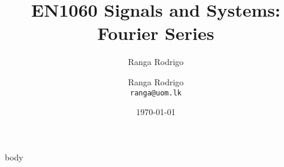 \documentclass[t, aspectratio=169,xcolor={svgnames}, 10pt]{beamer}
\title{EN1060 Signals and Systems: Fourier Series}
\author{Ranga Rodrigo}
\author[]{Ranga Rodrigo\\ \texttt{ranga@uom.lk}}
\institute[]{The University of Moratuwa, Sri Lanka}
\date{\today}
\begin{document}
    \begin{frame}
        \titlepage
    \end{frame}





    {body}













\end{document}
